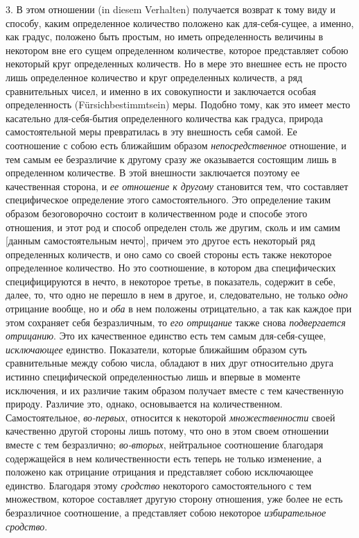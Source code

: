 3. В этом отношении (in diesem Verhalten) получается возврат к тому виду и
способу, каким определенное количество положено как для-себя-сущее, а
именно, как градус, положено быть простым, но иметь определенность величины
в некотором вне его сущем определенном количестве, которое представляет
собою некоторый круг определенных количеств. Но в мере это внешнее есть не
просто лишь определенное количество и круг определенных количеств, а ряд
сравнительных чисел, и именно в их совокупности и заключается особая
определенность (Fürsichbestimmtsein) меры. Подобно тому, как это имеет
место касательно для-себя-бытия определенного количества как градуса,
природа самостоятельной меры превратилась в эту внешность себя самой. Ее
соотношение с собою есть ближайшим образом
{\em непосредственное} отношение, и тем самым ее
безразличие к другому сразу же оказывается состоящим лишь в определенном
количестве. В этой внешности заключается поэтому ее качественная сторона, и
{\em ее отношение к другому} становится тем, что
составляет специфическое определение этого самостоятельного. Это
определение таким образом безоговорочно состоит в количественном роде и
способе этого отношения, и этот род и способ определен столь же другим,
сколь и им самим [данным самостоятельным нечто], причем это другое есть
некоторый ряд определенных количеств, и оно само со своей стороны есть
также некоторое определенное количество. Но это соотношение, в котором два
специфических специфицируются в нечто, в некоторое третье, в показатель,
содержит в себе, далее, то, что одно не перешло в нем в другое, и,
следовательно, не только {\em одно} отрицание вообще,
но и {\em оба} в нем положены отрицательно, а так как
каждое при этом сохраняет себя безразличным, то
{\em его отрицание} также снова
{\em подвергается отрицанию}. Это их качественное
единство есть тем самым для-себя-сущее,
{\em исключающее} единство. Показатели, которые
ближайшим образом суть сравнительные между собою числа, обладают в них друг
относительно друга истинно специфической определенностью лишь и впервые в
моменте исключения, и их различие таким образом получает вместе с тем
качественную природу. Различие это, однако, основывается на количественном.
Самостоятельное, {\em во-первых}, относится к некоторой
{\em множественности} своей качественно другой стороны
лишь потому, что оно в этом своем отношении вместе с тем безразлично;
{\em во-вторых}, нейтральное соотношение благодаря
содержащейся в нем количественности есть теперь не только изменение, а
положено как отрицание отрицания и представляет собою исключающее единство.
Благодаря этому {\em сродство} некоторого
самостоятельного с тем множеством, которое составляет другую сторону
отношения, уже более не есть безразличное соотношение, а представляет собою
некоторое {\em избирательное сродство}.

